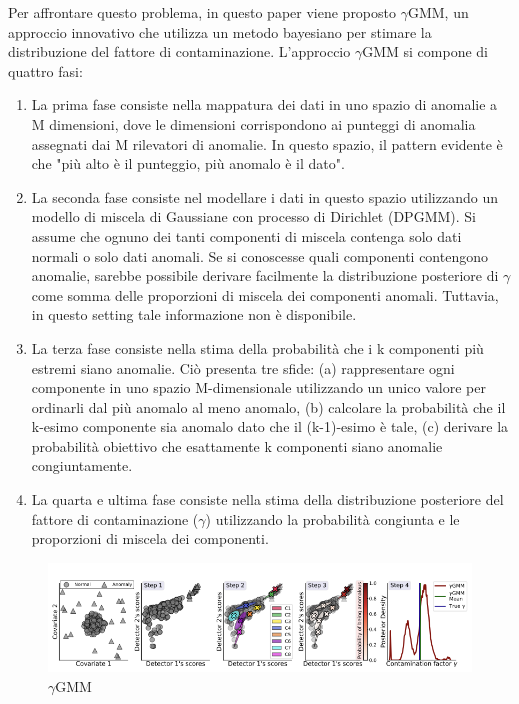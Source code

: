 Per affrontare questo problema, in questo paper viene proposto $\gamma$GMM, un approccio innovativo che utilizza un metodo bayesiano per stimare la distribuzione del fattore di contaminazione.
L'approccio $\gamma$GMM si compone di quattro fasi:
\begin{enumerate}
\item La prima fase consiste nella mappatura dei dati in uno spazio di anomalie a M dimensioni, dove le dimensioni corrispondono ai punteggi di anomalia assegnati dai M rilevatori di anomalie. In questo spazio, il pattern evidente è che "più alto è il punteggio, più anomalo è il dato".
\item La seconda fase consiste nel modellare i dati in questo spazio utilizzando un modello di miscela di Gaussiane con processo di Dirichlet (DPGMM). Si assume che ognuno dei tanti componenti di miscela contenga solo dati normali o solo dati anomali. Se si conoscesse quali componenti contengono anomalie, sarebbe possibile derivare facilmente la distribuzione posteriore di $\gamma$ come somma delle proporzioni di miscela dei componenti anomali. Tuttavia, in questo setting tale informazione non è disponibile.
\item La terza fase consiste nella stima della probabilità che i k componenti più estremi siano anomalie. Ciò presenta tre sfide: (a) rappresentare ogni componente in uno spazio M-dimensionale utilizzando un unico valore per ordinarli dal più anomalo al meno anomalo, (b) calcolare la probabilità che il k-esimo componente sia anomalo dato che il (k-1)-esimo è tale, (c) derivare la probabilità obiettivo che esattamente k componenti siano anomalie congiuntamente.
\item La quarta e ultima fase consiste nella stima della distribuzione posteriore del fattore di contaminazione ($\gamma$) utilizzando la probabilità congiunta e le proporzioni di miscela dei componenti.

\end{enumerate}
\begin{figure}[t]
	\centering
	\includegraphics[width=14cm, scale=1]{images/ygmm1}
	\caption{$\gamma$GMM}
	\label{ygmm1}
\end{figure}

